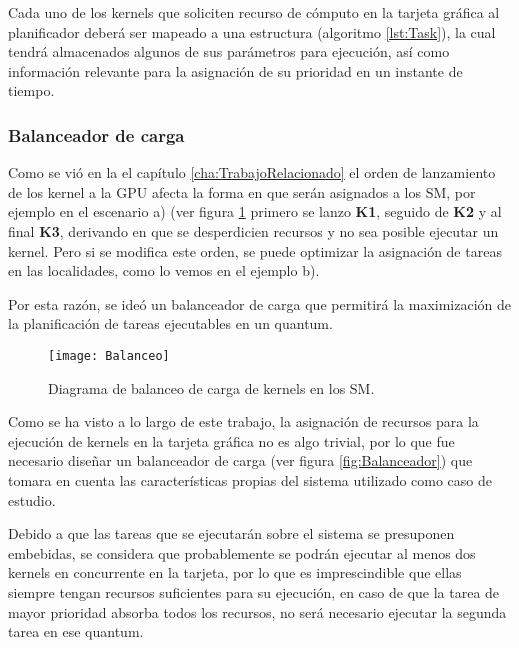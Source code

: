 Cada uno de los kernels que soliciten recurso de cómputo en la tarjeta gráfica al planificador deberá ser mapeado a una estructura (algoritmo \ref{lst:Task}), la cual tendrá almacenados algunos de sus parámetros para ejecución, así como información relevante para la asignación de su prioridad en un instante de tiempo.




\subsubsection{Balanceador de carga} \label{secc:balanceador}

Como se vió en la el capítulo \ref{cha:TrabajoRelacionado} el orden de lanzamiento de los kernel a la GPU afecta la forma en que serán asignados a los SM, por ejemplo en el escenario a) (ver figura \ref{fig:Balanceo} primero se lanzo \textbf{K1}, seguido de \textbf{K2} y al final \textbf{K3}, derivando en que se desperdicien recursos y no sea posible ejecutar un kernel. Pero si se modifica este orden, se puede optimizar la asignación de tareas en las localidades, como lo vemos en el ejemplo b).
\newline

Por esta razón, se ideó un balanceador de carga que permitirá la maximización de la planificación de tareas ejecutables en un quantum.
\newline

        \begin{figure}[ht]
      \centering
        \texttt{[image: Balanceo]}
        \caption{Diagrama de balanceo de carga de kernels en los SM.}
        \label{fig:Balanceo}
    \end{figure}
    
    Como se ha visto a lo largo de este trabajo, la asignación de recursos para la ejecución de kernels en la tarjeta gráfica no es algo trivial, por lo que fue necesario diseñar un balanceador de carga (ver figura \ref{fig:Balanceador}) que tomara en cuenta las características propias del sistema utilizado como caso de estudio.
    \newline
    
    Debido a que las tareas que se ejecutarán sobre el sistema se presuponen embebidas, se considera que probablemente se podrán ejecutar al menos dos kernels en concurrente en la tarjeta, por lo que es imprescindible que ellas siempre tengan recursos suficientes para su ejecución, en caso de que la tarea de mayor prioridad absorba todos los recursos, no será necesario ejecutar la segunda tarea en ese quantum.
\newline

